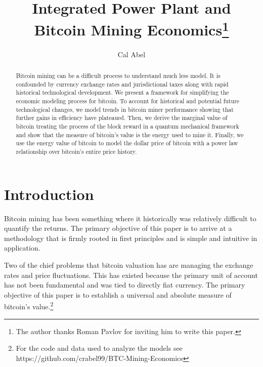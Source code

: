 \documentclass[runningheads]{llncs}
\begin{document}
%
\title{Integrated Power Plant and Bitcoin Mining Economics\thanks{The author thanks Roman Pavlov for inviting him to write this paper.}}
%
%
\author{Cal Abel}
%
%
%
\maketitle
%
\begin{abstract}
    Bitcoin mining can be a difficult process to understand much less model.
    It is confounded by currency exchange rates and jurisdictional taxes along with rapid historical technological development.
    We present a framework for simplifying the economic modeling process for bitcoin.
    To account for historical and potential future technological changes, we model trends in bitcoin miner performance showing that further gains in efficiency have plateaued.
    Then, we derive the marginal value of bitcoin treating the process of the block reward in a quantum mechanical framework and show that the measure of bitcoin's value is the energy used to mine it.
    Finally, we use the energy value of bitcoin to model the dollar price of bitcoin with a power law relationship over bitcoin's entire price history.

\end{abstract}



\section{Introduction}

Bitcoin mining has been something where it historically was relatively difficult to quantify the returns.
The primary objective of this paper is to arrive at a methodology that is firmly rooted in first principles and is simple and intuitive in application.

Two of the chief problems that bitcoin valuation has are managing the exchange rates and price fluctuations.
This has existed because the primary unit of account has not been fundamental and was tied to directly fiat currency.
The primary objective of this paper is to establish a universal and absolute measure of bitcoin's value.\footnote{
    For the code and data used to analyze the models see https://github.com/crabel99/BTC-Mining-Economics
}
\end{document}
